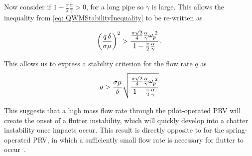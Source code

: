 Now consider if $1 - \frac{\pi}{2} \frac{\alpha}{\gamma} > 0$, for a long pipe so $\gamma$ is large. This allows the inequality from \cref{eq: QWMStabilityInequality} to be re-written as

\begin{equation*}
    \left( \frac{q \, \delta}{\sigma \mu} \right)^2 > \frac{\frac{\pi \sqrt{2}}{4} \frac{\alpha}{\gamma} \omega_p^{\;2}}{1 - \frac{\pi}{2}\frac{\alpha}{\gamma}} \, .
\end{equation*}

This allows us to express a stability criterion for the flow rate $q$ as
~
\begin{equation*}
    q > \frac{\sigma \mu}{\delta} \sqrt{\frac{\frac{\pi \sqrt{2}}{4}\frac{\alpha}{\gamma}\omega_p^{\;2}}{1 - \frac{\pi}{2}\frac{\alpha}{\gamma}}}
\end{equation*}

This suggests that a high mass flow rate through the pilot-operated PRV will create the onset of a flutter instability, which will quickly develop into a chatter instability once impacts occur. This result is directly opposite to for the spring-operated PRV, in which a sufficiently small flow rate is necessary for flutter to occur~\cite{Hos2015ModelPipe,Hos2016DynamicService}.


